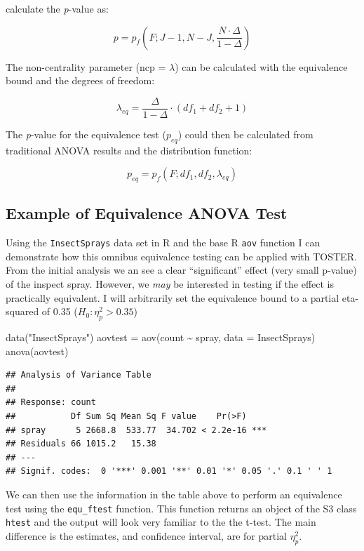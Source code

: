\documentclass[]{interact}
\theoremstyle{plain}%
\theoremstyle{definition}
\theoremstyle{remark}
\newenvironment{Shaded}{\begin{snugshade}}{\end{snugshade}}
\newcommand{\AttributeTok}[1]{\textcolor[rgb]{0.77,0.63,0.00}{#1}}
\newcommand{\FunctionTok}[1]{\textcolor[rgb]{0.00,0.00,0.00}{#1}}
\newcommand{\NormalTok}[1]{#1}
\newcommand{\OtherTok}[1]{\textcolor[rgb]{0.56,0.35,0.01}{#1}}
\newcommand{\SpecialCharTok}[1]{\textcolor[rgb]{0.00,0.00,0.00}{#1}}
\newcommand{\StringTok}[1]{\textcolor[rgb]{0.31,0.60,0.02}{#1}}
\begin{document}
\citet{Campbell_2021} calculate the \emph{p}-value as:

\[
p = p_f(F; J-1, N-J, \frac{N \cdot \Delta}{1-\Delta})
\]

The non-centrality parameter (ncp = \(\lambda\)) can be calculated with
the equivalence bound and the degrees of freedom:

\[
\lambda_{eq} = \frac{\Delta}{1-\Delta} \cdot(df_1 + df_2 +1)
\]

The \emph{p}-value for the equivalence test (\(p_{eq}\)) could then be
calculated from traditional ANOVA results and the distribution function:

\[
p_{eq} = p_f(F; df_1, df_2, \lambda_{eq})
\]

\hypertarget{example-of-equivalence-anova-test}{%
\subsection{Example of Equivalence ANOVA
Test}\label{example-of-equivalence-anova-test}}

Using the \texttt{InsectSprays} data set in R and the base R
\texttt{aov} function I can demonstrate how this omnibus equivalence
testing can be applied with TOSTER. From the initial analysis we an see
a clear ``significant'' effect (very small p-value) of the inspect
spray. However, we \emph{may} be interested in testing if the effect is
practically equivalent. I will arbitrarily set the equivalence bound to
a partial eta-squared of 0.35 (\(H_0: \eta^2_p > 0.35\))

\begin{Shaded}
\begin{Highlighting}[]
\FunctionTok{data}\NormalTok{(}\StringTok{"InsectSprays"}\NormalTok{)}
\NormalTok{aovtest }\OtherTok{=} \FunctionTok{aov}\NormalTok{(count }\SpecialCharTok{\textasciitilde{}}\NormalTok{ spray, }\AttributeTok{data =}\NormalTok{ InsectSprays)}
\FunctionTok{anova}\NormalTok{(aovtest)}
\end{Highlighting}
\end{Shaded}

\begin{verbatim}
## Analysis of Variance Table
## 
## Response: count
##           Df Sum Sq Mean Sq F value    Pr(>F)    
## spray      5 2668.8  533.77  34.702 < 2.2e-16 ***
## Residuals 66 1015.2   15.38                      
## ---
## Signif. codes:  0 '***' 0.001 '**' 0.01 '*' 0.05 '.' 0.1 ' ' 1
\end{verbatim}

We can then use the information in the table above to perform an
equivalence test using the \texttt{equ\_ftest} function. This function
returns an object of the S3 class \texttt{htest} and the output will
look very familiar to the the t-test. The main difference is the
estimates, and confidence interval, are for partial \(\eta^2_p\).
\end{document}
